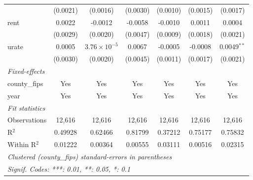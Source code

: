 \begin{tabular}{lcccccc}
                        & (0.0021)                      & (0.0016)                    & (0.0030)                         & (0.0010)                      & (0.0015)                      & (0.0017)\\   
   rent                 & 0.0022                        & -0.0012                     & -0.0058                          & -0.0010                       & 0.0011                        & 0.0004\\   
                        & (0.0029)                      & (0.0020)                    & (0.0047)                         & (0.0009)                      & (0.0018)                      & (0.0021)\\   
   urate                & 0.0005                        & $3.76\times 10^{-5}$        & 0.0067                           & -0.0005                       & -0.0008                       & 0.0049$^{**}$\\   
                        & (0.0030)                      & (0.0020)                    & (0.0045)                         & (0.0011)                      & (0.0017)                      & (0.0021)\\   
   \midrule
   \emph{Fixed-effects}\\
   county\_fips         & Yes                           & Yes                         & Yes                              & Yes                           & Yes                           & Yes\\  
   year                 & Yes                           & Yes                         & Yes                              & Yes                           & Yes                           & Yes\\  
   \midrule
   \emph{Fit statistics}\\
   Observations         & 12,616                        & 12,616                      & 12,616                           & 12,616                        & 12,616                        & 12,616\\  
   R$^2$                & 0.49928                       & 0.62466                     & 0.81799                          & 0.37212                       & 0.75177                       & 0.75832\\  
   Within R$^2$         & 0.01222                       & 0.00364                     & 0.00555                          & 0.03111                       & 0.00516                       & 0.02315\\  
   \midrule \midrule
   \multicolumn{7}{l}{\emph{Clustered (county\_fips) standard-errors in parentheses}}\\
   \multicolumn{7}{l}{\emph{Signif. Codes: ***: 0.01, **: 0.05, *: 0.1}}\\
\end{tabular}
\par\endgroup



